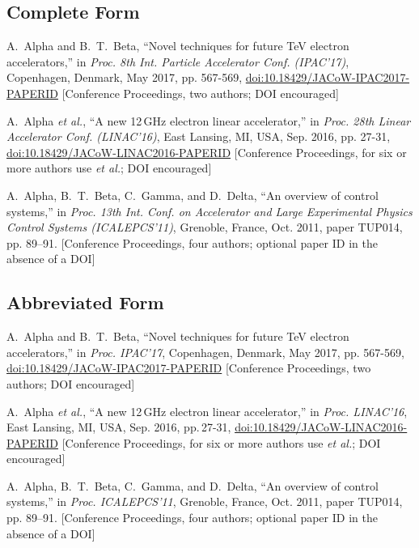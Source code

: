 \subsection{Complete Form}

\newcommand{\CCom}[2]{\newline\textcolor{#1}{[#2]}}
\begin{thebibliography}{9} %
	
	A.~Alpha and B.~T.~Beta, “Novel techniques for future TeV electron accelerators,”
	in \textit{Proc. 8th Int. Particle Accelerator Conf. (IPAC’17)},
	Copenhagen, Denmark, May 2017, 
	pp. 567-569, \url{doi:10.18429/JACoW-IPAC2017-PAPERID}
	\CCom{jgreen}{Conference Proceedings, two authors; DOI encouraged}

	A.~Alpha \emph{et al.},
	“A new 12\,GHz electron linear accelerator,”
	in \emph{Proc. 28th Linear Accelerator Conf. (LINAC’16)},
	East Lansing, MI, USA, Sep. 2016, pp. 27-31, \newline
	\url{doi:10.18429/JACoW-LINAC2016-PAPERID}
	\CCom{jgreen}{Conference Proceedings, for six or more authors use \emph{et al.};	
		 DOI encouraged}
	
	A.~Alpha, B.~T.~Beta, C.~Gamma, and D.~Delta,
	“An overview of control systems,”
	in \emph{Proc. 13th Int. Conf. on Accelerator and Large Experimental Physics Control Systems (ICALEPCS’11)}, Grenoble, France, Oct. 2011,
	paper TUP014, pp. 89--91.
	\CCom{jgreen}{Conference Proceedings, four authors; optional paper ID
	in the absence of a DOI}
\end{thebibliography}

\vspace*{-.5\baselineskip}
\subsection{Abbreviated Form}

\begin{thebibliography}{9} %
	A.~Alpha and B.~T.~Beta, “Novel techniques for future TeV electron accelerators,”
	in \textit{Proc. IPAC’17}, Copenhagen, Denmark, May 2017, 
	pp. 567-569, \newline
	\url{doi:10.18429/JACoW-IPAC2017-PAPERID}
	\CCom{jgreen}{Conference Proceedings, two authors; DOI encouraged}
	
	A.~Alpha \emph{et al.},
	“A new 12\,GHz electron linear accelerator,”
	in \emph{Proc. LINAC’16},
	East Lansing, MI, USA, Sep. 2016, pp.\,27-31, 
	\url{doi:10.18429/JACoW-LINAC2016-PAPERID}
	\CCom{jgreen}{Conference Proceedings, for six or more authors use \emph{et al.};	
		 		  DOI encouraged}
	
	A.~Alpha, B.~T.~Beta, C.~Gamma, and D.~Delta,
	“An overview of control systems,”
	in \emph{Proc. ICALEPCS’11}, Grenoble, France, Oct. 2011,
	paper TUP014, pp. 89--91.
	\CCom{jgreen}{Conference Proceedings, four authors; optional paper ID
				  in the absence of a DOI}
\end{thebibliography}

